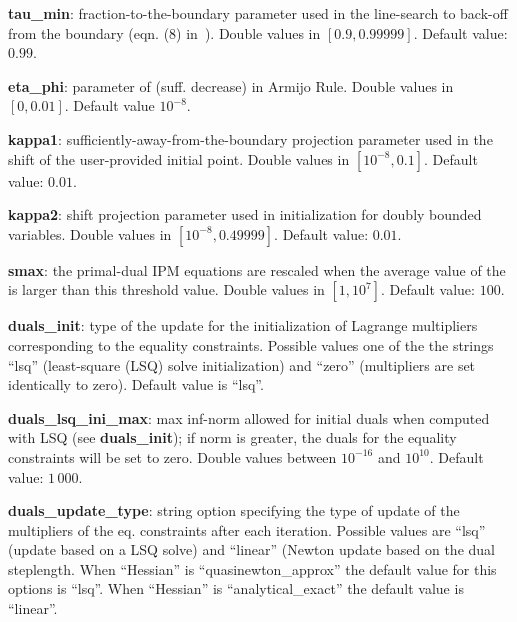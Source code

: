 \documentclass[11pt]{article}
\newcounter{line}
\begin{document}
\medskip


\noindent \textbf{tau\_min}: fraction-to-the-boundary parameter used in the line-search to back-off from the boundary (eqn. (8) in~\cite{waecther_05_ipopt0}). Double values in $[0.9, 0.99999]$. Default value: $0.99$. 

\medskip

\noindent \textbf{eta\_phi}: parameter of (suff. decrease) in Armijo Rule. Double values in $[ 0, 0.01]$. Default value $10^{-8}$.

\medskip


\noindent \textbf{kappa1}: sufficiently-away-from-the-boundary projection parameter used in the shift of the user-provided initial point. Double values in $[10^{-8},0.1]$. Default value: $0.01$. 

\medskip


\noindent \textbf{kappa2}: shift projection parameter used in initialization for doubly bounded variables. Double values in $[10^{-8},0.49999]$. Default value: $0.01$. 

\medskip

\noindent \textbf{smax}: the primal-dual IPM equations are rescaled when the average value of the is larger than this threshold value. Double values in $[1,10^7]$. Default value: $100$. 

\medskip


\noindent \textbf{duals\_init}: type of the update for the initialization of Lagrange multipliers corresponding to  the equality constraints. Possible values one of the the strings ``lsq'' (least-square (LSQ) solve initialization) and ``zero'' (multipliers are set identically to zero). Default value is ``lsq''.

\medskip

\noindent \textbf{duals\_lsq\_ini\_max}: max inf-norm allowed for initial duals when computed with LSQ (see \textbf{duals\_init}); if norm is greater, the duals for the equality constraints will be set to zero. Double values between $10^{-16}$ and $10^{10}$. Default value: $1\,000$.

\medskip


\noindent \textbf{duals\_update\_type}: string option specifying the type of update of the multipliers of the eq. constraints after each iteration. Possible values are ``lsq'' (update based on a LSQ solve) and ``linear'' (Newton update based on the dual steplength. When ``Hessian'' is ``quasinewton\_approx'' the default value for this options is ``lsq''. When ``Hessian'' is ``analytical\_exact'' the default value is ``linear''.
\end{document}

